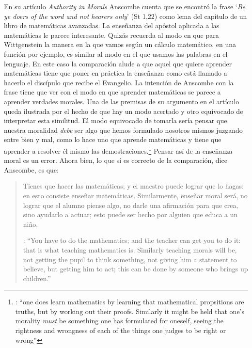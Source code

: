 En su artículo \emph{Authority in Morals} Anscombe cuenta que se encontró la frase \enquote*{\emph{Be ye doers of the word and not hearers only}} (St 1,22) como lema del capítulo de un libro de matemáticas avanzadas. La enseñanza del apóstol aplicada a las matemáticas le parece interesante. Quizás recuerda al modo en que para Wittgenstein la manera en la que vamos según un cálculo matemático, en una función por ejemplo, es similar al modo en el que usamos las palabras en el lenguaje. En este caso la comparación alude a que aquel que quiere aprender matemáticas tiene que poner en práctica la enseñanza como está llamado a hacerlo el discípulo que recibe el Evangelio. La intención de Anscombe con la frase tiene que ver con el modo en que aprender matemáticas se parece a aprender verdades morales. Una de las premisas de su argumento en el artículo queda ilustrada por el hecho de que hay un modo acertado y otro equivocado de interpretar esta similitud. El modo equivocado de tomarla sería pensar que nuestra moralidad \emph{debe} ser algo que hemos formulado nosotros mismos juzgando entre bien y mal, como lo hace uno que aprende matemáticas y tiene que aprender a resolver él mismo las demostraciones.\footnote{\cite[Cf.~][45]{anscombe1981erp:am}: \enquote{one does learn mathematics by learning that mathematical propsitions are truths, but by working out their proofs. Similarly it might be held that one's morality \emph{must} be something one has formulated for oneself, seeing the rightness and wrongness of each of the things one judges to be right or wrong}} Pensar así de la enseñanza moral es un error. Ahora bien, lo que sí es correcto de la comparación, dice Anscombe, es que: \blockquote[{\cite[47]{anscombe1981erp:am}}: \enquote{You have to do the mathematics; and the teacher can get you to do it: that is what teaching mathematics is. Similarly teaching morals will be, not getting the pupil to think something, not giving him a statement to believe, but getting him to act; this can be done by someone who brings up children.}]{Tienes que hacer las matemáticas; y el maestro puede lograr que lo hagas: en esto consiste enseñar matemáticas. Similarmente, enseñar moral será, no lograr que el alumno piense algo, no darle una afirmación para que crea, sino ayudarlo a actuar; esto puede ser hecho por alguien que educa a un niño.}

